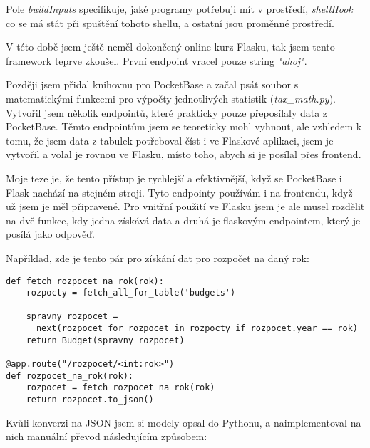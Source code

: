 \documentclass[11pt,a4paper,twoside,openright]{report}
\begin{document}
Pole \emph{buildInputs} specifikuje, jaké programy potřebuji mít v prostředí, \emph{shellHook} co se má
stát při spuštění tohoto shellu, a ostatní jsou proměnné prostředí.


V této době jsem ještě neměl dokončený online kurz Flasku, tak jsem tento framework teprve zkoušel. První
endpoint vracel pouze string \emph{"ahoj"}.

Později jsem přidal knihovnu pro PocketBase a začal psát soubor s matematickými funkcemi pro výpočty
jednotlivých statistik (\emph{tax\_math.py}). Vytvořil jsem několik endpointů, které prakticky pouze
přeposílaly data z PocketBase. Těmto endpointům jsem se teoreticky mohl vyhnout, ale vzhledem k tomu,
že jsem data z tabulek potřeboval číst i ve Flaskové aplikaci, jsem je vytvořil a volal je rovnou ve
Flasku, místo toho, abych si je posílal přes frontend.

Moje teze je, že tento přístup je rychlejší a efektivnější, když se PocketBase i Flask nachází na stejném
stroji. Tyto endpointy používám i na frontendu, když už jsem je měl připravené. Pro vnitřní použití ve
Flasku jsem je ale musel rozdělit na dvě funkce, kdy jedna získává data a druhá je flaskovým endpointem,
který je posílá jako odpověď.

Například, zde je tento pár pro získání dat pro rozpočet na daný rok:

\begin{verbatim}
def fetch_rozpocet_na_rok(rok):
    rozpocty = fetch_all_for_table('budgets')

    spravny_rozpocet =
      next(rozpocet for rozpocet in rozpocty if rozpocet.year == rok)
    return Budget(spravny_rozpocet)

@app.route("/rozpocet/<int:rok>")
def rozpocet_na_rok(rok):
    rozpocet = fetch_rozpocet_na_rok(rok)
    return rozpocet.to_json()
\end{verbatim}

Kvůli konverzi na JSON jsem si modely opsal do Pythonu, a naimplementoval na nich manuální převod
následujícím způsobem:
\end{document}
